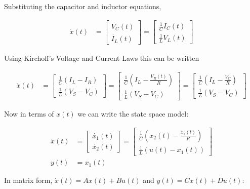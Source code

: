 \documentclass[11pt]{article}
\theoremstyle{definition}
\begin{document}
\begin{enumerate}
\begin{enumerate}
        Substituting the capacitor and inductor equations,

        \begin{align}
            \dot{x}(t) &=  \begin{bmatrix} \dot{V_C}(t) \\ \dot{I_L}(t) \end{bmatrix} = \begin{bmatrix} \frac{1}{C} I_C(t) \\ \frac{1}{L} V_L(t) \end{bmatrix} 
        \end{align}

        Using Kirchoff's Voltage and Current Laws this can be written

        \begin{align}
            \dot{x}(t) &=  \begin{bmatrix} \frac{1}{C} (I_L - I_R) \\ \frac{1}{L} (V_S - V_C) \end{bmatrix} = \begin{bmatrix} \frac{1}{C} (I_L - \frac{V_R(t)}{R}) \\ \frac{1}{L} (V_S - V_C) \end{bmatrix} = \begin{bmatrix} \frac{1}{C} (I_L - \frac{V_C}{R}) \\ \frac{1}{L} (V_S - V_C) \end{bmatrix}
        \end{align}

        Now in terms of $x(t)$ we can write the state space model:

        \begin{align}
            \dot{x}(t) &=  \begin{bmatrix} \dot{x_1}(t) \\ \dot{x_2}(t) \end{bmatrix} = \begin{bmatrix} \frac{1}{C} (x_2(t) - \frac{x_1(t)}{R}) \\ \frac{1}{L} (u(t)- x_1(t)) \end{bmatrix} \\
            y(t) &= x_1(t)
        \end{align}

        In matrix form, $\dot{x}(t) = A x(t) + B u(t)$ and $y(t) = C x(t) + D u(t)$:


\end{enumerate}
\end{enumerate}
\end{document}
